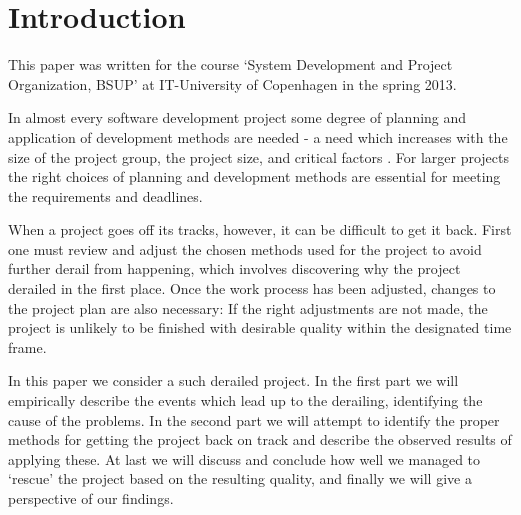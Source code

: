 \section{Introduction}
This paper was written for the course `System Development and Project Organization, BSUP' at IT-University of Copenhagen in the spring 2013.

In almost every software development project some degree of planning and application of development methods are needed - a need which increases with the size of the project group, the project size, and critical factors \cite[p. 134]{ac}. For larger projects the right choices of planning and development methods are essential for meeting the requirements and deadlines.

When a project goes off its tracks, however, it can be difficult to get it back. First one must review and adjust the chosen methods used for the project to avoid further derail from happening, which involves discovering why the project derailed in the first place.
Once the work process has been adjusted, changes to the project plan are also necessary: If the right adjustments are not made, the project is unlikely to be finished with desirable quality within the designated time frame.

In this paper we consider a such derailed project.
In the first part we will empirically describe the events which lead up to the derailing, identifying the cause of the problems. In the second part we will attempt to identify the proper methods for getting the project back on track and describe the observed results of applying these. At last we will discuss and conclude how well we managed to `rescue' the project based on the resulting quality, and finally we will give a perspective of our findings.